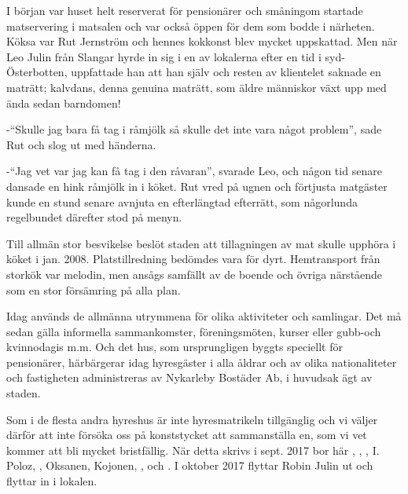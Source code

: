 I början var huset helt reserverat för pensionärer och småningom startade matservering i matsalen och var också öppen för dem som bodde i närheten. Köksa var Rut Jernström och hennes kokkonst blev mycket uppskattad. Men när Leo Julin från Slangar hyrde in sig i en av lokalerna efter en tid i syd-Österbotten, uppfattade han att han själv och resten av klientelet saknade en maträtt; kalvdans, denna genuina maträtt, som äldre människor växt  upp med ända sedan barndomen!

-``Skulle jag bara få tag i råmjölk så skulle det inte vara något problem'', sade Rut och slog ut med händerna.

-``Jag vet var jag kan få tag i den råvaran'', svarade Leo, och någon tid senare dansade en hink råmjölk in i köket. Rut vred på ugnen och förtjusta matgäster kunde en stund senare avnjuta en efterlängtad efterrätt, som
någorlunda regelbundet därefter stod på menyn.

Till allmän stor besvikelse beslöt staden att tillagningen av mat skulle upphöra i köket i jan. 2008. Platstillredning bedömdes vara för dyrt. Hemtransport från storkök var melodin, men ansågs samfällt av de boende och övriga närstående som en stor försämring på alla plan.

Idag används de allmänna utrymmena för olika aktiviteter och samlingar. Det må sedan gälla informella sammankomster, föreningsmöten, kurser eller gubb-och kvinnodagis m.m. Och det hus, som ursprungligen byggts speciellt för pensionärer, härbärgerar idag hyresgäster i alla åldrar och av olika nationaliteter och fastigheten administreras av Nykarleby Bostäder Ab, i huvudsak ägt av staden.

Som i de flesta andra hyreshus är inte hyresmatrikeln tillgänglig och vi väljer därför att inte försöka oss på konststycket att sammanställa en, som vi vet kommer att bli mycket bristfällig. När detta skrivs i sept.
2017 bor här , , , I. Poloz, , Oksanen, Kojonen, ,  och . I oktober 2017 flyttar Robin Julin ut och  flyttar in i lokalen.



%



